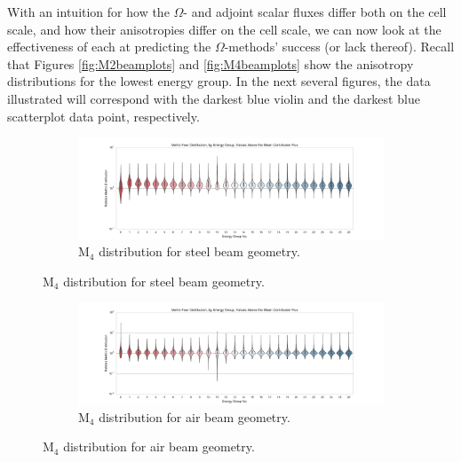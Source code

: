 With an intuition for how the $\Omega$- and adjoint scalar fluxes differ both on
the cell scale, and how their anisotropies differ on the cell scale, we can
now look at the effectiveness of each at predicting the $\Omega$-methods'
success (or lack thereof). Recall that Figures \ref{fig:M2beamplots} and
\ref{fig:M4beamplots} show the anisotropy distributions for the lowest energy
group. In the next several figures, the data illustrated will
correspond with the
darkest blue violin and the darkest blue scatterplot data point, respectively.

\begin{figure}[htb!]
  \centering
  \begin{subfigure}[t]{\textwidth}
    \includegraphics[width=\linewidth]{./chapters/characterization_probs/figures/char/prob_1/metric_four_violin_mean.pdf}
    \caption{M$_4$ distribution for steel beam geometry.}
    \label{fig:beamsteelviolins}
  \end{subfigure}
\end{figure}
\begin{figure}[htb!]\ContinuedFloat
  \centering
  \begin{subfigure}[t]{\textwidth}
    \includegraphics[width=\linewidth]{./chapters/characterization_probs/figures/char/prob1v1/metric_four_violin_mean.pdf}
    \caption{M$_4$ distribution for air beam geometry.}
    \label{fig:beamairviolins}
  \end{subfigure}
\end{figure}
